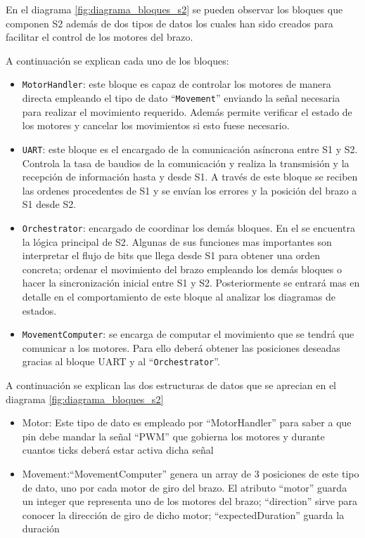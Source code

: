 En el diagrama \ref{fig:diagrama_bloques_s2} se pueden observar los bloques que componen \ac{S2} además de dos tipos de datos los cuales han sido creados para facilitar el control de los motores del brazo.

A continuación se explican cada uno de los bloques:

\begin{itemize}
    \item \texttt{MotorHandler}: este bloque es capaz de controlar los motores de manera directa empleando el tipo de dato ``\texttt{Movement}'' enviando la señal necesaria para realizar el movimiento requerido. Además permite verificar el estado de los motores y cancelar los movimientos si esto fuese necesario.
    
    \item \texttt{UART}: este bloque es el encargado de la comunicación asíncrona entre \ac{S1} y \ac{S2}. Controla la tasa de baudios de la comunicación y realiza la transmisión y la recepción de información hasta y desde \ac{S1}. A través de este bloque se reciben las ordenes procedentes de \ac{S1} y se envían los errores y la posición del brazo a S1 desde \ac{S2}.
    
    \item \texttt{Orchestrator}: encargado de coordinar los demás bloques. En el se encuentra la lógica principal de \ac{S2}. Algunas de sus funciones mas importantes son interpretar el flujo de bits que llega desde S1 para obtener una orden concreta; ordenar el movimiento del brazo empleando los demás bloques o hacer la sincronización inicial entre \ac{S1} y  \ac{S2}. Posteriormente se entrará mas en detalle en el comportamiento de este bloque al analizar los diagramas de estados.
    
    \item \texttt{MovementComputer}: se encarga de computar el movimiento que se tendrá que comunicar a los motores. Para ello deberá obtener las posiciones deseadas gracias al bloque UART y al ``\texttt{Orchestrator}''.
\end{itemize}

A continuación se explican las dos estructuras de datos que se aprecian en el diagrama \ref{fig:diagrama_bloques_s2}

\begin{itemize}
    \item Motor: Este tipo de dato es empleado por ``MotorHandler'' para saber a que pin debe mandar la señal ``PWM'' que gobierna los motores y durante cuantos ticks deberá estar activa dicha señal
    
    \item Movement:``MovementComputer'' genera un array de 3 posiciones de este tipo de dato, uno por cada motor de giro del brazo. El atributo ``motor'' guarda un integer que representa uno de los motores del brazo; ``direction'' sirve para conocer la dirección de giro de dicho motor; ``expectedDuration'' guarda la duración  
\end{itemize}

